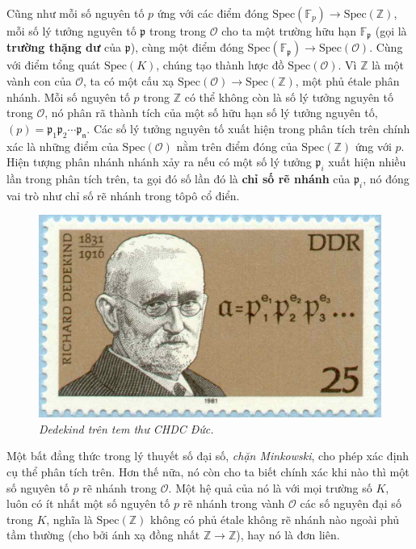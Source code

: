 \begin{multicols}{2}
	\vskip 0.1cm
	Cũng như mỗi số nguyên tố $p$ ứng với các điểm đóng $\text{Spec}(\mathbb{F}_p) \to \text{Spec}(\mathbb{Z})$, mỗi số lý tưởng nguyên tố $\mathfrak{p}$ trong trong $\mathcal{O}$ cho ta một trường hữu hạn $\mathbb{F}_{\mathfrak{p}}$ (gọi là {\bf\color{duongvaotoanhoc} trường thặng dư} của $\mathfrak{p}$), cùng một điểm đóng $\text{Spec}(\mathbb{F}_{\mathfrak{p}}) \to \text{Spec}(\mathcal{O})$. Cùng với điểm tổng quát $\text{Spec}(K)$, chúng tạo thành lược đồ $\text{Spec}(\mathcal{O})$. Vì $\mathbb{Z}$ là một vành con của $\mathcal{O}$, ta có một cấu xạ $\text{Spec}(\mathcal{O}) \to \text{Spec}(\mathbb{Z})$, một phủ étale phân nhánh. Mỗi số nguyên tố $p$ trong $\mathbb{Z}$ có thể không còn là số lý tưởng nguyên tố trong $\mathcal{O}$, nó phân rã thành tích của một số hữu hạn số lý tưởng nguyên tố, $(p) = \mathfrak{p_1}\mathfrak{p_2}\cdots\mathfrak{p_n}$. Các số lý tưởng nguyên tố xuất hiện trong phân tích trên chính xác là những điểm của $\text{Spec}(\mathcal{O})$ nằm trên điểm đóng của $\text{Spec}(\mathbb{Z})$ ứng với $p$. Hiện tượng phân nhánh nhánh xảy ra nếu có một số lý tưởng $\mathfrak{p}_i$ xuất hiện nhiều lần trong phân tích trên, ta gọi đó số lần đó là {\bf\color{duongvaotoanhoc} chỉ số rẽ nhánh} của $\mathfrak{p}_i$, nó đóng vai trò như chỉ số rẽ nhánh trong tôpô cổ điển.
	\begin{figure}[H]
		\vspace*{-5pt}
		\centering
		\captionsetup{labelformat= empty, justification=centering}
		\includegraphics[width= 1\linewidth]{Dedekind}
		\caption{\small\textit{\color{duongvaotoanhoc}Dedekind trên tem thư CHDC Đức.}}
		\vspace*{-10pt}
	\end{figure}
	Một bất đẳng thức trong lý thuyết số đại số, {\it chặn Minkowski}, cho phép xác định cụ thể phân tích trên. Hơn thế nữa, nó còn cho ta biết chính xác khi nào thì một số nguyên tố $p$ rẽ nhánh trong $\mathcal{O}$. Một hệ quả của nó là với mọi trường số $K$, luôn có ít nhất một số nguyên tố $p$ rẽ nhánh trong vành $\mathcal{O}$ các số nguyên đại số trong $K$, nghĩa là $\text{Spec}(\mathbb{Z})$ không có phủ  étale không rẽ nhánh nào ngoài phủ tầm thường (cho bởi ánh xạ đồng nhất $\mathbb{Z} \to \mathbb{Z}$), hay nó là đơn liên.

\end{multicols}

